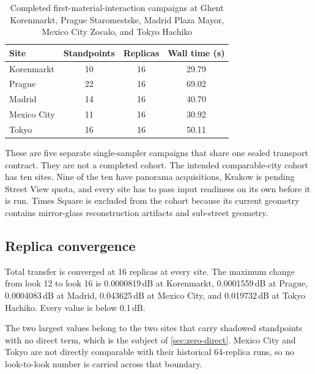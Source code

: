 \begin{table}[!t]
  \caption{Completed first-material-interaction campaigns at Ghent
  Korenmarkt, Prague Staromestske, Madrid Plaza Mayor, Mexico City Zocalo, and
  Tokyo Hachiko}
  \label{tab:five-city}
  \centering
  \setlength{\tabcolsep}{4pt}
  \begin{tabular}{lccc}
    \toprule
    Site & Standpoints & Replicas & Wall time (s) \\
    \midrule
    Korenmarkt  & 10 & 16 & 29.79 \\
    Prague      & 22 & 16 & 69.02 \\
    Madrid      & 14 & 16 & 40.70 \\
    Mexico City & 11 & 16 & 30.92 \\
    Tokyo       & 16 & 16 & 50.11 \\
    \bottomrule
  \end{tabular}
\end{table}

These are five separate single-sampler campaigns that share one sealed
transport contract. They are not a completed cohort. The intended
comparable-city cohort has ten sites. Nine of the ten have panorama
acquisitions, Krakow is pending Street View quota, and every site has to pass
input readiness on its own before it is run. Times Square is excluded from the
cohort because its current geometry contains mirror-glass reconstruction
artifacts and sub-street geometry.


\subsection{Replica convergence}
\label{sec:convergence}

Total transfer is converged at 16 replicas at every site. The maximum change
from look 12 to look 16 is 0.0000819\,dB at Korenmarkt, 0.0001559\,dB at
Prague, 0.0004083\,dB at Madrid, 0.043625\,dB at Mexico City, and
0.019732\,dB at Tokyo Hachiko. Every value is below 0.1\,dB.

The two largest values belong to the two sites that carry shadowed standpoints
with no direct term, which is the subject of \cref{sec:zero-direct}. Mexico
City and Tokyo are not directly comparable with their historical 64-replica
runs, so no look-to-look number is carried across that boundary.

